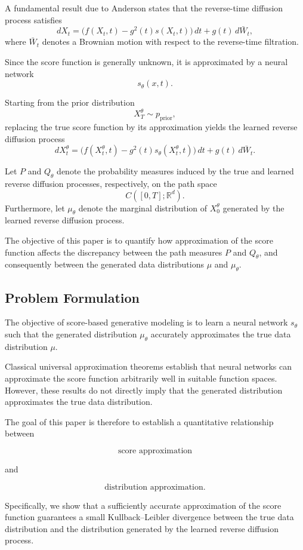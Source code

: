 \documentclass[11pt]{article}
\begin{document}
A fundamental result due to Anderson \cite{Anderson1982} states that the
reverse-time diffusion process satisfies
\[
dX_t
=
\bigl(
f(X_t,t)
-
g^2(t)s(X_t,t)
\bigr)\,dt
+
g(t)\,d\bar W_t,
\]
where $\bar W_t$ denotes a Brownian motion with respect to the reverse-time
filtration.

Since the score function is generally unknown, it is approximated by a
neural network
\[
s_\theta(x,t).
\]

Starting from the prior distribution
\[
X_T^\theta\sim p_{\mathrm{prior}},
\]
replacing the true score function by its approximation yields the learned
reverse diffusion process
\[
dX_t^\theta
=
\bigl(
f(X_t^\theta,t)
-
g^2(t)s_\theta(X_t^\theta,t)
\bigr)\,dt
+
g(t)\,d\bar W_t.
\]

Let $P$ and $Q_\theta$ denote the probability measures induced by the true
and learned reverse diffusion processes, respectively, on the path space
\[
C([0,T];\mathbb R^d).
\]
Furthermore, let $\mu_\theta$ denote the marginal distribution of
$X_0^\theta$ generated by the learned reverse diffusion process.

The objective of this paper is to quantify how approximation of the score
function affects the discrepancy between the path measures $P$ and
$Q_\theta$, and consequently between the generated data distributions
$\mu$ and $\mu_\theta$.
\subsection{Problem Formulation}

The objective of score-based generative modeling is to learn a neural network
$s_\theta$ such that the generated distribution $\mu_\theta$ accurately
approximates the true data distribution $\mu$.

Classical universal approximation theorems establish that neural networks can
approximate the score function arbitrarily well in suitable function spaces.
However, these results do not directly imply that the generated distribution
approximates the true data distribution.

The goal of this paper is therefore to establish a quantitative relationship
between

\[
\text{score approximation}
\]

and

\[
\text{distribution approximation}.
\]

Specifically, we show that a sufficiently accurate approximation of the score
function guarantees a small Kullback--Leibler divergence between the true data
distribution and the distribution generated by the learned reverse diffusion
process.
\end{document}
